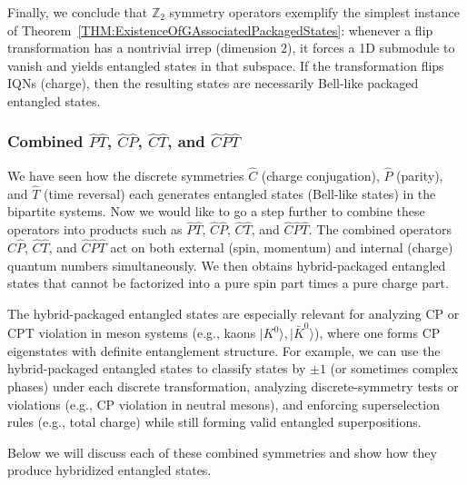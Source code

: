 \documentclass[12pt,a4paper]{article}
\begin{document}
Finally, we conclude that $\mathbb{Z}_2$ symmetry operators exemplify the simplest instance of Theorem~\ref{THM:ExistenceOfGAssociatedPackagedStates}: whenever a flip transformation has a nontrivial irrep (dimension $2$), it forces a 1D submodule to vanish and yields entangled states in that subspace.
If the transformation flips IQNs (charge), then the resulting states are necessarily Bell-like packaged entangled states.



\subsubsection{Combined $\hat{P}\hat{T}$, $\hat{C}\hat{P}$, $\hat{C}\hat{T}$, and $\hat{C}\hat{P}\hat{T}$}


We have seen how the discrete symmetries $\hat{C}$ (charge conjugation), $\hat{P}$ (parity), and $\hat{T}$ (time reversal) each generates entangled states (Bell-like states) in the bipartite systems.
Now we would like to go a step further to combine these operators into products such as $\hat{P}\hat{T}$, $\hat{C}\hat{P}$, $\hat{C}\hat{T}$, and $\hat{C}\hat{P}\hat{T}$.\cite{Luders1957,Hooft1976,Banks1991,KimCarosi2010}
The combined operators $\hat{C}\hat{P}$, $\hat{C}\hat{T}$, and $\hat{C}\hat{P}\hat{T}$ act on both external (spin, momentum) and internal (charge) quantum numbers simultaneously.
We then obtains hybrid-packaged entangled states that cannot be factorized into a pure spin part times a pure charge part.


The hybrid-packaged entangled states are especially relevant for analyzing CP or CPT violation in meson systems (e.g., kaons $\lvert K^0\rangle,\lvert\bar{K}^0\rangle$), where one forms CP eigenstates with definite entanglement structure.
For example, we can use the hybrid-packaged entangled states to
classify states by $\pm1$ (or sometimes complex phases) under each discrete transformation, 
analyzing discrete-symmetry tests or violations (e.g., CP violation in neutral mesons),  
and enforcing superselection rules (e.g., total charge) while still forming valid entangled superpositions.


Below we will discuss each of these combined symmetries and show how they produce hybridized entangled states.
\end{document}
